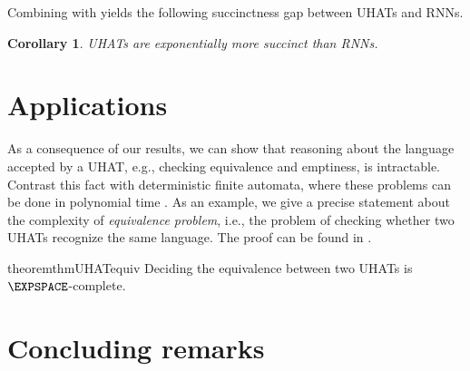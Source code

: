 \documentclass{article} %
\newtheorem{corollary}[theorem]{Corollary}
\newcommand{\fix}{\marginpar{FIX}}
\begin{document}
Combining  with  yields the following succinctness gap between UHATs and RNNs.
\begin{corollary}\label{cor:rnn-succinct}
UHATs are exponentially more succinct than RNNs.
\end{corollary}

\section{Applications}
\label{sec:apps}
%

As a consequence of our results, we can show that reasoning about the language accepted by a UHAT, e.g., checking
equivalence and emptiness, is intractable.
Contrast this fact with deterministic finite automata, where these problems can be done in
polynomial time \citep{Kozen}. 
As an example, we give a precise statement about the complexity of \emph{equivalence problem},
i.e., the problem of checking whether two UHATs recognize the same
language.
The proof can be found in .
\begin{restatable}[]{theorem}{thmUHATequiv}\label{thm:UHAT-equiv}
Deciding the equivalence between two UHATs is $\EXPSPACE$-complete.
\end{restatable}

\section{Concluding remarks}
\label{sec:related}
\end{document}
